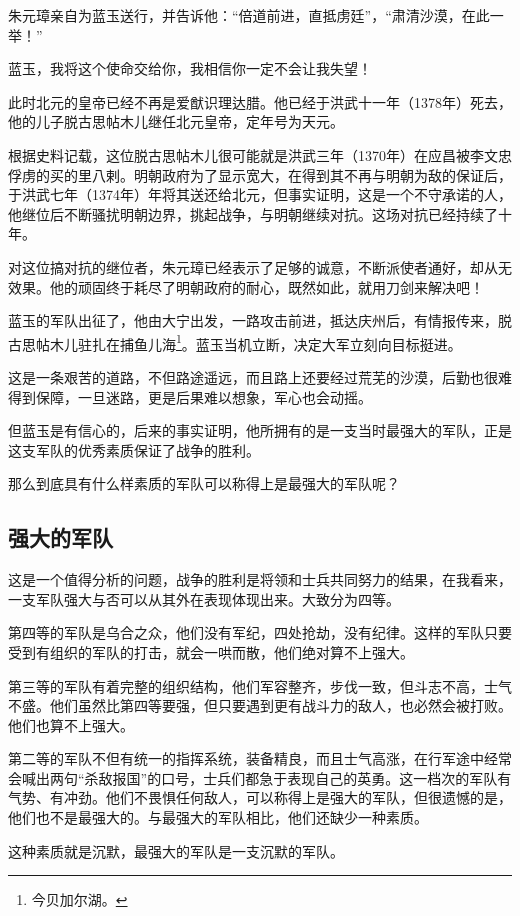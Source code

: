 \begin{multicols}{\theparacolNo}
		朱元璋亲自为蓝玉送行，并告诉他：“倍道前进，直抵虏廷”，“肃清沙漠，在此一举！”

		蓝玉，我将这个使命交给你，我相信你一定不会让我失望！

		此时北元的皇帝已经不再是爱猷识理达腊。他已经于洪武十一年（1378年）死去，他的儿子脱古思帖木儿继任北元皇帝，定年号为天元。

		根据史料记载，这位脱古思帖木儿很可能就是洪武三年（1370年）在应昌被李文忠俘虏的买的里八剌。明朝政府为了显示宽大，在得到其不再与明朝为敌的保证后，于洪武七年（1374年）年将其送还给北元，但事实证明，这是一个不守承诺的人，他继位后不断骚扰明朝边界，挑起战争，与明朝继续对抗。这场对抗已经持续了十年。

		对这位搞对抗的继位者，朱元璋已经表示了足够的诚意，不断派使者通好，却从无效果。他的顽固终于耗尽了明朝政府的耐心，既然如此，就用刀剑来解决吧！

		蓝玉的军队出征了，他由大宁出发，一路攻击前进，抵达庆州后，有情报传来，脱古思帖木儿驻扎在捕鱼儿海\footnote{今贝加尔湖。}。蓝玉当机立断，决定大军立刻向目标挺进。

		这是一条艰苦的道路，不但路途遥远，而且路上还要经过荒芜的沙漠，后勤也很难得到保障，一旦迷路，更是后果难以想象，军心也会动摇。

		但蓝玉是有信心的，后来的事实证明，他所拥有的是一支当时最强大的军队，正是这支军队的优秀素质保证了战争的胜利。

		那么到底具有什么样素质的军队可以称得上是最强大的军队呢？

		\subsection{强大的军队}
		这是一个值得分析的问题，战争的胜利是将领和士兵共同努力的结果，在我看来，一支军队强大与否可以从其外在表现体现出来。大致分为四等。

		第四等的军队是乌合之众，他们没有军纪，四处抢劫，没有纪律。这样的军队只要受到有组织的军队的打击，就会一哄而散，他们绝对算不上强大。

		第三等的军队有着完整的组织结构，他们军容整齐，步伐一致，但斗志不高，士气不盛。他们虽然比第四等要强，但只要遇到更有战斗力的敌人，也必然会被打败。他们也算不上强大。

		第二等的军队不但有统一的指挥系统，装备精良，而且士气高涨，在行军途中经常会喊出两句“杀敌报国”的口号，士兵们都急于表现自己的英勇。这一档次的军队有气势、有冲劲。他们不畏惧任何敌人，可以称得上是强大的军队，但很遗憾的是，他们也不是最强大的。与最强大的军队相比，他们还缺少一种素质。

		这种素质就是沉默，最强大的军队是一支沉默的军队。


\end{multicols}
